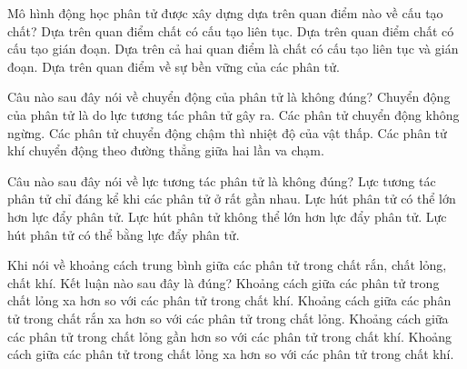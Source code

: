 \begin{ex}
Mô hình động học phân tử được xây dựng dựa trên quan điểm nào về cấu tạo chất?
\choice
{Dựa trên quan điểm chất có cấu tạo liên tục.}
{\True Dựa trên quan điểm chất có cấu tạo gián đoạn.}
{Dựa trên cả hai quan điểm là chất có cấu tạo liên tục và gián đoạn.}
{Dựa trên quan điểm về sự bền vững của các phân tử.}
\end{ex}

\begin{ex}
Câu nào sau đây nói về chuyển động của phân tử là không đúng?
\choice
{\True Chuyển động của phân tử là do lực tương tác phân tử gây ra.}
{Các phân tử chuyển động không ngừng.}
{Các phân tử chuyển động chậm thì nhiệt độ của vật thấp.}
{Các phân tử khí chuyển động theo đường thẳng giữa hai lần va chạm.} 
\end{ex}

\begin{ex}
Câu nào sau đây nói về lực tương tác phân tử là không đúng?
\choice
{Lực tương tác phân tử chỉ đáng kể khi các phân tử ở rất gần nhau.}
{Lực hút phân tử có thể lớn hơn lực đẩy phân tử.}
{\True Lực hút phân tử không thể lớn hơn lực đẩy phân tử.}
{Lực hút phân tử có thể bằng lực đẩy phân tử.}
\end{ex}


\begin{ex}
Khi nói về khoảng cách trung bình giữa các phân tử trong chất rắn, chất lỏng, chất khí. Kết luận nào sau đây là đúng?
\choice
{Khoảng cách giữa các phân tử trong chất lỏng xa hơn so với các phân tử trong chất khí.}
{Khoảng cách giữa các phân tử trong chất rắn xa hơn so với các phân tử trong chất lỏng.}
{\True Khoảng cách giữa các phân tử trong chất lỏng gần hơn so với các phân tử trong chất khí.}
{Khoảng cách giữa các phân tử trong chất lỏng xa hơn so với các phân tử trong chất khí.}
\end{ex}


